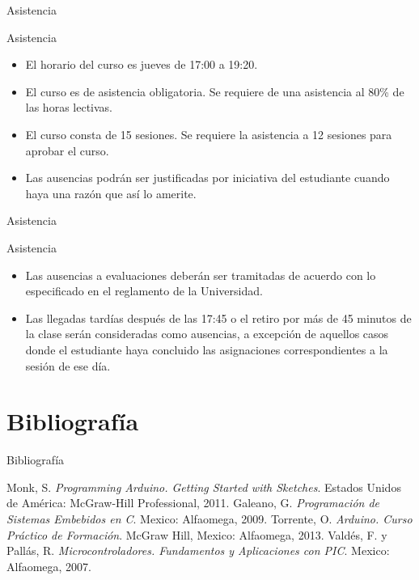 \documentclass[handout,xcolor=dvipsnames]{beamer}
\newcommand{\pageframe}[1]{\frame{\begin{center}{ \Huge #1 }\end{center}}}
\begin{document}
\begin{frame}{Asistencia}
\begin{block}{Asistencia}
  \begin{itemize}[<+->]
  	\item El horario del curso es jueves de 17:00 a 19:20.
    \item El curso es de asistencia obligatoria. Se requiere de una asistencia al 80\% de las horas lectivas.
    \item El curso consta de 15 sesiones. Se requiere la asistencia a 12 sesiones para aprobar el curso.
    \item Las ausencias podrán ser justificadas por iniciativa del estudiante cuando haya una razón que así lo amerite.
  \end{itemize}
\end{block}
\end{frame}

\begin{frame}{Asistencia}
\begin{block}{Asistencia}
  \begin{itemize}[<+->]
	\item Las ausencias a evaluaciones deberán ser tramitadas de acuerdo con lo especificado en el reglamento de la Universidad.
    \item Las llegadas tardías después de las 17:45 o el retiro por más de 45 minutos de la clase serán consideradas como ausencias, a excepción de aquellos casos donde el estudiante haya concluido las asignaciones correspondientes a la sesión de ese día.
  \end{itemize}
\end{block}
\end{frame}

\section{Bibliografía}

\pageframe{Bibliografía}
\nocite{*}

\begin{frame}{Bibliografía}

\begin{thebibliography}{5}
  Monk, S. 
  \textit{Programming Arduino. Getting Started with Sketches}.
  Estados Unidos de América: McGraw-Hill Professional,
  2011.
  Galeano, G.
  \textit{Programación de Sistemas Embebidos en C}.
  Mexico: Alfaomega,
  2009.
  Torrente, O.
  \textit{Arduino. Curso Práctico de Formación}.
  McGraw Hill,
  Mexico: Alfaomega,
  2013.
  Valdés, F. y Pallás, R.
  \textit{Microcontroladores. Fundamentos y Aplicaciones con PIC}.
  Mexico: Alfaomega,
  2007.
\end{thebibliography}

\end{frame}
\end{document}
